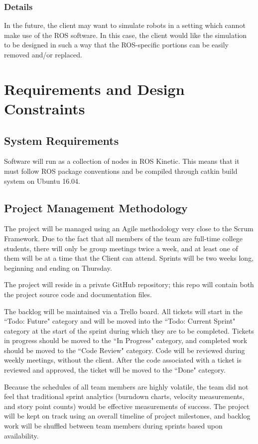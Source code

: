 \subsubsection*{Details}
In the future, the client may want to simulate robots in a setting which cannot make use of the ROS software. In this case, the client would like the simulation to be designed in such a way that the ROS-specific portions can be easily removed and/or replaced.

\section{Requirements and Design Constraints}
\subsection{System  Requirements}
Software will run as a collection of nodes in ROS Kinetic. This means that it must follow ROS package conventions and be compiled through catkin build system on Ubuntu 16.04.

\subsection{Project  Management Methodology}
The project will be managed using an Agile methodology very close to the Scrum Framework. Due to the fact that all members of the team are full-time college students, there will only be group meetings twice a week, and at least one of them will be at a time that the Client can attend. Sprints will be two weeks long, beginning and ending on Thursday.

The project will reside in a private GitHub repository; this repo will contain both the project source code and documentation files.

The backlog will be maintained via a Trello board. All tickets will start in the ``Todo: Future" category and will be moved into the ``Todo: Current Sprint" category at the start of the sprint during which they are to be completed. Tickets in progress should be moved to the ``In Progress" category, and completed work should be moved to the ``Code Review" category. Code will be reviewed during weekly meetings, without the client. After the code associated with a ticket is reviewed and approved, the ticket will be moved to the ``Done" category.

Because the schedules of all team members are highly volatile, the team did not feel that traditional sprint analytics (burndown charts, velocity measurements, and story point counts) would be effective measurements of success. The project will be kept on track using an overall timeline of project milestones, and backlog work will be shuffled between team members during sprints based upon availability.

